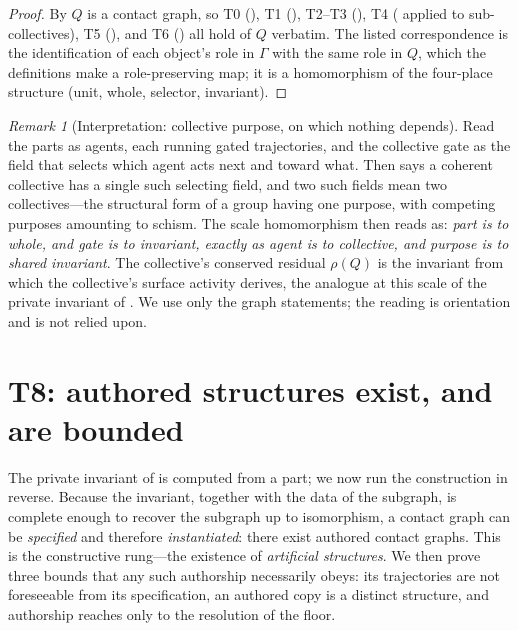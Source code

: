 \documentclass[11pt,a4paper]{article}
\theoremstyle{thmstyle}
\theoremstyle{definition}
\theoremstyle{remark}
\newtheorem{remark}[theorem]{Remark}
\newcommand{\Gph}{\Gamma}                 %
\newcommand{\Res}{\rho}                   %
\newcommand{\Quot}{Q}                     %
\begin{document}
\begin{proof}
By  $\Quot$ is a contact graph, so T0
(), T1 (), T2--T3
(), T4 (
applied to sub-collectives), T5 (), and T6
() all hold of $\Quot$ verbatim. The listed correspondence is
the identification of each object's role in $\Gph$ with the same role in $\Quot$,
which the definitions make a role-preserving map; it is a homomorphism of the
four-place structure (unit, whole, selector, invariant).
\end{proof}

\begin{remark}[Interpretation: collective purpose, on which nothing depends]
\label{rem:purpose}
Read the parts as agents, each running gated trajectories, and the collective
gate as the field that selects which agent acts next and toward what. Then
 says a coherent collective has a single such selecting
field, and two such fields mean two collectives---the structural form of a group
having one purpose, with competing purposes amounting to schism. The scale
homomorphism  then reads as: \emph{part is to whole, and
gate is to invariant, exactly as agent is to collective, and purpose is to shared
invariant}. The collective's conserved residual $\Res(\Quot)$ is the invariant
from which the collective's surface activity derives, the analogue at this scale
of the private invariant of . We use only the graph
statements; the reading is orientation and is not relied upon.
\end{remark}


\section{T8: authored structures exist, and are bounded}
\label{sec:construct}

The private invariant of  is computed from a part; we now
run the construction in reverse. Because the invariant, together with the data of
the subgraph, is complete enough to recover the subgraph up to isomorphism, a
contact graph can be \emph{specified} and therefore \emph{instantiated}: there
exist authored contact graphs. This is the constructive rung---the existence of
\emph{artificial structures}. We then prove three bounds that any such authorship
necessarily obeys: its trajectories are not foreseeable from its specification,
an authored copy is a distinct structure, and authorship reaches only to the
resolution of the floor.
\end{document}
